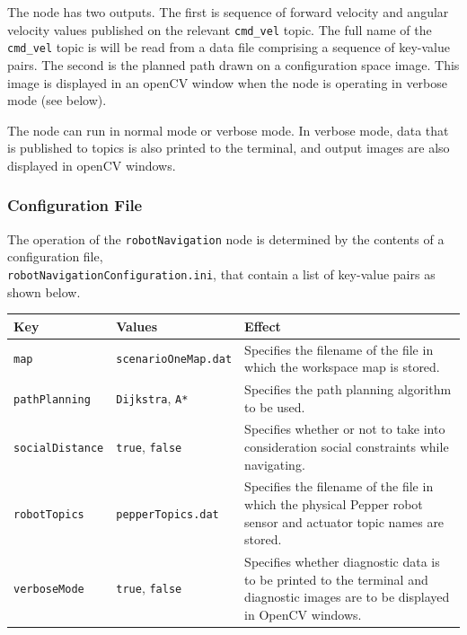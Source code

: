 \documentclass{CSSRforAfrica}
\begin{document}
{{The node has two outputs. The first is sequence of forward velocity and angular velocity values published on the relevant {\small \verb+cmd_vel+} topic. The full name of the  {\small \verb+cmd_vel+} topic is  will be read from a data file comprising a sequence of key-value pairs.     The second is the planned path drawn on a configuration space image. This image is displayed in an openCV window when the node is operating in verbose mode (see below).  
 
The node can run in normal mode or verbose mode. In verbose mode, data that is published to topics is also printed to the terminal, and output images are also displayed in openCV windows.
 
\subsubsection*{Configuration File}

The operation of the {\small \verb+robotNavigation+} node is determined by the contents of a configuration file, \\ {\small \verb+robotNavigationConfiguration.ini+}, that  contain a list of key-value pairs as shown below.  
 
\begin{center}
\begin{tabularx}{\linewidth}{| l | l | X|}
\hline 
{\small Key }                               & {\small Values }                                                 &  {\small Effect}       \\
\hline
{\footnotesize \verb+map+ }  & {\footnotesize \verb+scenarioOneMap.dat+}     & {\small Specifies the filename of the file in which the workspace map is stored.} \\ 
\hline
{\footnotesize \verb+pathPlanning+ }  & {\footnotesize \verb+Dijkstra+, \verb+A*+}     & {\small Specifies the path planning algorithm to be used.} \\ 
\hline
{\footnotesize \verb+socialDistance+ }  & {\footnotesize \verb+true+,  \verb+false+}     & {\small Specifies whether or not to take into consideration social constraints while navigating.} \\ 
\hline
{\footnotesize \verb+robotTopics+ }  & {\footnotesize \verb+pepperTopics.dat+}     & {\small Specifies the filename of the file in which the physical Pepper robot sensor and actuator topic names are stored.} \\
\hline
{\footnotesize \verb+verboseMode+}  & {\footnotesize \verb+true+, \verb+false+}     & {\small Specifies whether diagnostic data is to be printed to the terminal and diagnostic images are to be displayed in OpenCV windows.} \\
\hline
\end{tabularx}
\end{center}


}}
\end{document}
